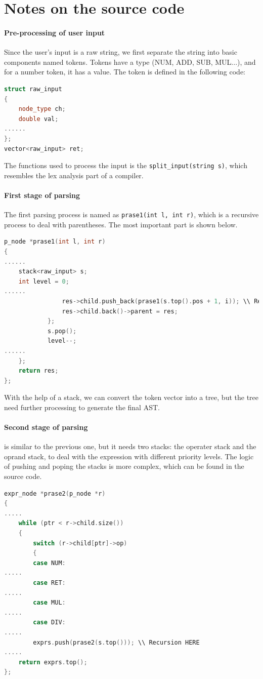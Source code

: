 \documentclass[cn,black,12pt,normal]{elegantnote}
\begin{document}
\section{Notes on the source code}

\paragraph{Pre-processing of user input} Since the user's input is a raw string, we first separate the string into basic components named tokens. Tokens have a type (NUM, ADD, SUB, MUL...), and for a number token, it has a value. The token is defined in the following code:
\begin{lstlisting}[language = C++]
struct raw_input
{
	node_type ch;
	double val;
......
};
vector<raw_input> ret;
\end{lstlisting}
The functions used to process the input is the \lstinline{split_input(string s)}, which resembles the lex analysis part of a compiler.

\paragraph{First stage of parsing}
The first parsing process is named as \lstinline{prase1(int l, int r)}, which is a recursive process to deal with parentheses. The most important part is shown below.
\begin{lstlisting}[language = C++]
p_node *prase1(int l, int r)
{
......
	stack<raw_input> s;
	int level = 0;
......
				res->child.push_back(prase1(s.top().pos + 1, i)); \\ Recursion HERE
				res->child.back()->parent = res;
			};
			s.pop();
			level--;
......
	};
	return res;
};
\end{lstlisting}
With the help of a stack, we can convert the token vector into a tree, but the tree need further processing to generate the final AST.

\paragraph{Second stage of parsing} is similar to the previous one, but it needs two stacks: the operater stack and the oprand stack, to deal with the expression with different priority levels. The logic of pushing and poping the stacks is more complex, which can be found in the source code.
\begin{lstlisting}[language = C++]
expr_node *prase2(p_node *r)
{
.....
	while (ptr < r->child.size())
	{
		switch (r->child[ptr]->op)
		{
		case NUM:
.....
		case RET:
.....
		case MUL:
.....
		case DIV:
.....
        exprs.push(prase2(s.top())); \\ Recursion HERE
.....
	return exprs.top();
};
\end{lstlisting}
\end{document}
